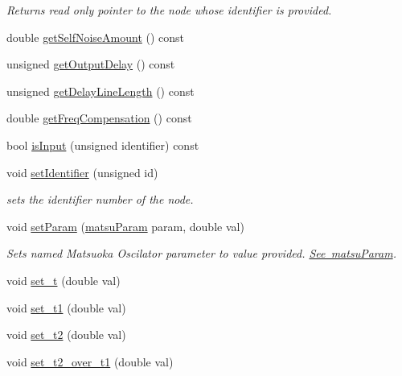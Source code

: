 \begin{DoxyCompactItemize}
\begin{DoxyCompactList}\small\item\em Returns read only pointer to the node whose identifier is provided. \end{DoxyCompactList}\item 
double \mbox{\hyperlink{classMatsuNode_a8af234bda8b179e1d3f7bb1a89377b43}{get\+Self\+Noise\+Amount}} () const
\item 
unsigned \mbox{\hyperlink{classMatsuNode_aaeed82f766fea6677f966b26f88b004d}{get\+Output\+Delay}} () const
\item 
unsigned \mbox{\hyperlink{classMatsuNode_acc0811649b340d1f2f0addede2f60e93}{get\+Delay\+Line\+Length}} () const
\item 
double \mbox{\hyperlink{classMatsuNode_a590a4f246adb14ac3e646289fabc7966}{get\+Freq\+Compensation}} () const
\item 
bool \mbox{\hyperlink{classMatsuNode_ae6b9a2f6b11ec66c1e1ee352532a8544}{is\+Input}} (unsigned identifier) const
\item 
void \mbox{\hyperlink{classMatsuNode_aff58c0ee6aaaaa21f3f8ef532728cacc}{set\+Identifier}} (unsigned id)
\begin{DoxyCompactList}\small\item\em sets the identifier number of the node. \end{DoxyCompactList}\item 
void \mbox{\hyperlink{classMatsuNode_aa207e9b0d5de53e9aa1c84f3aae46178}{set\+Param}} (\mbox{\hyperlink{classMatsuNode_aed801e1d0363292efc99bb02f1911386}{matsu\+Param}} param, double val)
\begin{DoxyCompactList}\small\item\em Sets named Matsuoka Oscilator parameter to value provided. \mbox{\hyperlink{classMatsuNode_aed801e1d0363292efc99bb02f1911386}{See matsu\+Param}}. \end{DoxyCompactList}\item 
void \mbox{\hyperlink{classMatsuNode_af68c93af36bc872c0b99c2060648fde5}{set\+\_\+t}} (double val)
\item 
void \mbox{\hyperlink{classMatsuNode_ae082ffc97e6744b6fce1d6bc94efbca2}{set\+\_\+t1}} (double val)
\item 
void \mbox{\hyperlink{classMatsuNode_ab2b901994e0811066e3c452414fcbad7}{set\+\_\+t2}} (double val)
\item 
void \mbox{\hyperlink{classMatsuNode_abc14c3e623fd341dc012a6640bbf1ebd}{set\+\_\+t2\+\_\+over\+\_\+t1}} (double val)
\item 

\end{DoxyCompactItemize}
